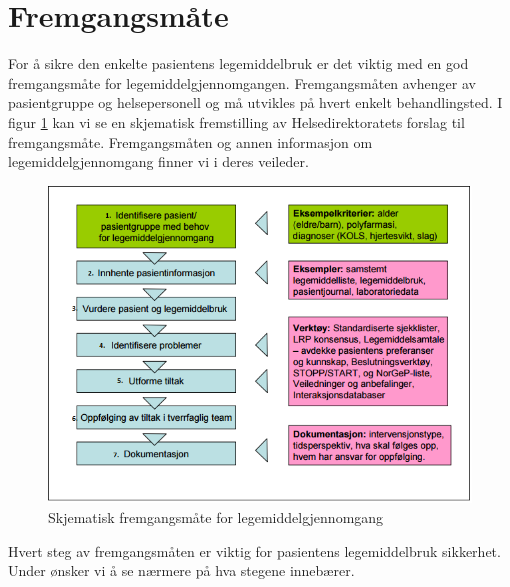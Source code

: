 \section{Fremgangsmåte}
For å sikre den enkelte pasientens legemiddelbruk er det viktig med en god fremgangsmåte for legemiddelgjennomgangen. Fremgangsmåten avhenger av pasientgruppe og helsepersonell og må utvikles på hvert enkelt behandlingsted. I figur \ref{fig:lmgfremgangsmate} kan vi se en skjematisk fremstilling av Helsedirektoratets forslag til fremgangsmåte. Fremgangsmåten og annen informasjon om legemiddelgjennomgang finner vi i deres veileder. \citep{Helsedirektoratet_veileder_LMG}

\begin{figure}[H]
\centering
\includegraphics{images/skjematisk_fremgangsmaate_lmg.png}
\caption{Skjematisk fremgangsmåte for legemiddelgjennomgang}
\label{fig:lmgfremgangsmate}
\end{figure}

Hvert steg av fremgangsmåten er viktig for pasientens legemiddelbruk sikkerhet. Under ønsker vi å se nærmere på hva stegene innebærer.

